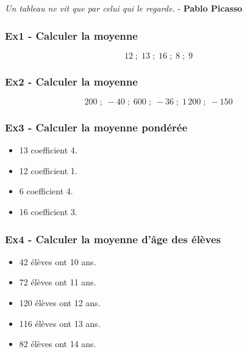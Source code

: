 



\begin{center}
  \textit{Un tableau ne vit que par celui qui le regarde.} - \textbf{Pablo Picasso}
\end{center}

\begin{multicols}{2}\noindent
\subsubsection*{Ex1 - Calculer la moyenne}

$$12 \; ; \; 13 \; ; \; 16 \; ; \; 8 \; ; \; 9$$

\subsubsection*{Ex2 - Calculer la moyenne}

$$200 \; ; \; -40 \; ; \; 600 \; ; \; -36 \; ; \; 1\,200 \; ; \; -150$$
\end{multicols}


\begin{multicols}{2}\noindent
\subsubsection*{Ex3 - Calculer la moyenne pondérée}

\begin{itemize}[label={$\bullet$}]
  \item 13 coefficient 4. 
  \item 12 coefficient 1. 
  \item 6 coefficient 4. 
  \item 16 coefficient 3. 
\end{itemize} 

\subsubsection*{Ex4 - Calculer la moyenne d'âge des élèves}

\begin{itemize}[label={$\bullet$}]
  \item 42 élèves ont 10 ans.
  \item 72 élèves ont 11 ans.
  \item 120 élèves ont 12 ans.
  \item 116 élèves ont 13 ans.
  \item 82 élèves ont 14 ans.
\end{itemize} 
\end{multicols}


